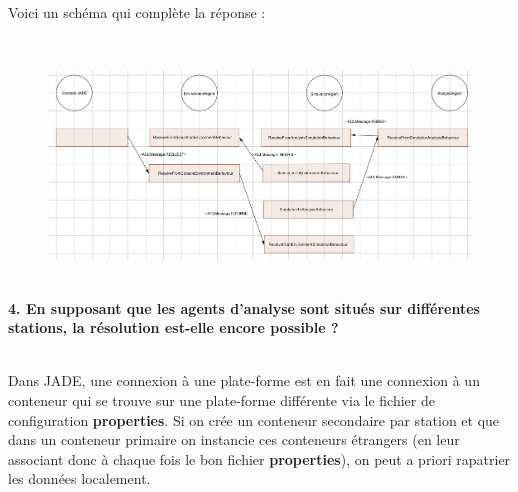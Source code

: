 \documentclass[11pt]{report}
\begin{document}
\newpage
Voici un schéma qui complète la réponse :

~\\
\begin{figure}[h]
\begin{center}
\includegraphics[width=\textwidth]{schema.png}
\end{center}
\end{figure}

~\\
\textbf{4. En supposant que les agents d'analyse sont situés sur différentes stations, la résolution
est-elle encore possible ?}

~\\
Dans JADE, une connexion à une plate-forme est en fait une connexion à un conteneur qui se trouve sur une plate-forme différente via le fichier de configuration \textbf{properties}. Si on crée un conteneur secondaire par station et que dans un conteneur primaire on instancie ces conteneurs étrangers (en leur associant donc à chaque fois le bon fichier \textbf{properties}), on peut a priori rapatrier les données localement.
\end{document}
